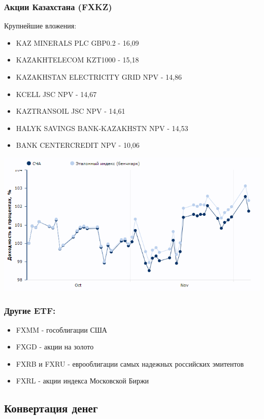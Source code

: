 \subsubsection{Акции Казахстана (FXKZ)}

Крупнейшие вложения:

\begin{itemize}
	\item KAZ MINERALS PLC GBP0.2 - 16,09%
	\item KAZAKHTELECOM KZT1000 - 15,18%
	\item KAZAKHSTAN ELECTRICITY GRID NPV - 14,86%
	\item KCELL JSC NPV - 14,67%
	\item KAZTRANSOIL JSC NPV - 14,61%
	\item HALYK SAVINGS BANK-KAZAKHSTN NPV - 14,53%
	\item BANK CENTERCREDIT NPV - 10,06%
\end{itemize}

\includegraphics[width=16cm]{pics/alina/kz.png}

\subsubsection{Другие ETF:}

\begin{itemize}
	\item FXMM - гособлигации США
	\item FXGD - акции на золото
	\item FXRB и FXRU - еврооблигации самых надежных российских эмитентов
	\item FXRL - акции индекса Московской Биржи
\end{itemize}

\subsection{Конвертация денег}

